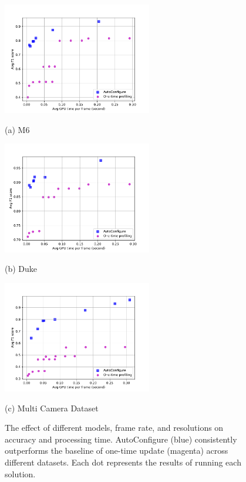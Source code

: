 
\begin{figure}[!t]
		\begin{minipage}[t]{0.32\linewidth}
			\centerline{\includegraphics[width=6.5cm]{figures/m6.pdf}}
			\centerline{(a) M6}
		\end{minipage}
		\hfill
		\begin{minipage}[t]{0.32\linewidth}
			\centerline{\includegraphics[width=6.5cm]{figures/duke.pdf}}
			\centerline{(b) Duke}
		\end{minipage}
		\hfill
		\begin{minipage}[t]{0.32\linewidth}
			\centerline{\includegraphics[width=6.5cm]{figures/_Westbound_Eastbound_Rear.pdf}}
			\centerline{(c) Multi Camera Dataset}
		\end{minipage}		
		\caption{The effect of different models, frame rate, and resolutions on accuracy and processing time. AutoConfigure (blue) consistently outperforms the baseline of one-time update (magenta) across different datasets. Each dot represents the results of running each solution.}
		\label{fig_results}
\end{figure}